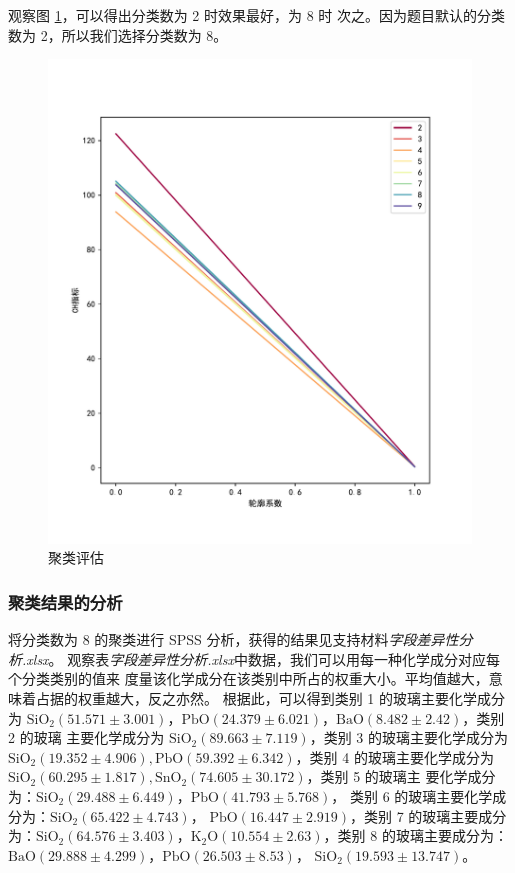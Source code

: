 \documentclass[withoutpreface,bwprint]{cumcmthesis} %
\begin{document}
观察图 \ref{fig:clusterEvaluation}，可以得出分类数为 2 时效果最好，为 8 时
次之。因为题目默认的分类数为 2，所以我们选择分类数为 8。
\begin{figure}[!htb]
    \centering
    \includegraphics[scale=0.4]{聚类评估.pdf}
    \caption{聚类评估}
    \label{fig:clusterEvaluation}
\end{figure}

\subsubsection{聚类结果的分析}
将分类数为 8 的聚类进行 SPSS 分析，获得的结果见支持材料\emph{字段差异性分析.xlsx}。
观察表\emph{字段差异性分析.xlsx}中数据，我们可以用每一种化学成分对应每个分类类别的值来
度量该化学成分在该类别中所占的权重大小。平均值越大，意味着占据的权重越大，反之亦然。
根据此，可以得到类别 1 的玻璃主要化学成分为 $\mathrm{SiO_2(51.571\pm 3.001)}$，$
\mathrm{PbO(24.379\pm 6.021)}$，$\mathrm{BaO(8.482\pm 2.42)}$，类别 2 的玻璃
主要化学成分为 
$\mathrm{SiO_2}(89.663\pm 7.119)$，类别 3 的玻璃主要化学成分为 $\mathrm{SiO_2
(19.352\pm 4.906),PbO(59.392\pm 6.342)}$，类别 4 的玻璃主要化学成分为 
$\mathrm{SiO_2(60.295\pm 1.817),SnO_2(74.605\pm 30.172)}$，类别 5 的玻璃主
要化学成分为：$\mathrm{SiO_2}(29.488\pm 6.449)$，$\mathrm{PbO}(41.793±5.768)$，
类别 6 的玻璃主要化学成分为：$\mathrm{SiO_2}(65.422\pm 4.743)$，
$\mathrm{PbO}(16.447\pm 2.919)$，类别 7 的玻璃主要成分为：$\mathrm{SiO_2}
(64.576\pm 3.403)$，$\mathrm{K_2O}(10.554\pm 2.63)$，类别 8 的玻璃主要成分为：
$\mathrm{BaO}(29.888\pm 4.299)$，$\mathrm{PbO}(26.503±8.53)$，
$\mathrm{SiO_2}(19.593\pm 13.747)$。
\end{document}
